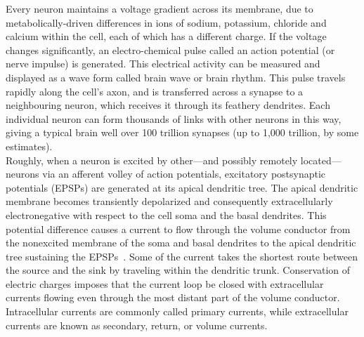 Every neuron maintains a voltage gradient across its membrane, due to metabolically-driven differences in ions of sodium, potassium, chloride and calcium within the cell, each of which has a different charge. If the voltage changes significantly, an electro-chemical pulse called an action potential (or nerve impulse) is generated. This electrical activity can be measured and displayed as a wave form called brain wave or brain rhythm. This pulse travels rapidly along the cell's axon, and is transferred across a synapse to a neighbouring neuron, which receives it through its feathery dendrites. Each individual neuron can form thousands of links with other neurons in this way, giving a typical brain well over 100 trillion synapses (up to 1,000 trillion, by some estimates).\\

Roughly, when a neuron is excited by other—and possibly remotely located—neurons via an afferent volley of action potentials, excitatory postsynaptic potentials (EPSPs) are generated at its apical dendritic tree. The apical dendritic membrane becomes transiently depolarized and consequently extracellularly electronegative with respect to the cell soma and the basal dendrites. This potential difference causes a current to flow through the volume conductor from the nonexcited membrane of the soma and basal dendrites to the apical dendritic tree sustaining the EPSPs~\cite{gloor1985neuronal}.
Some of the current takes the shortest route between the source and the sink by traveling within the dendritic trunk. Conservation of electric charges imposes that the current loop be closed with extracellular currents flowing even through the most distant part of the volume conductor. Intracellular currents are commonly called primary currents, while extracellular currents are known as secondary, return, or volume currents.\\

